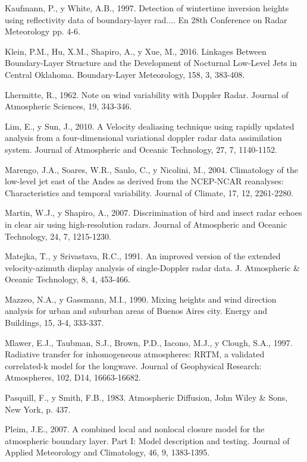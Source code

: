 \documentclass[12pt,spanish,oneside, a4paper]{book}
\begin{document}
\hypertarget{ref-Kaufmann1997}{}
Kaufmann, P., y White, A.B., 1997. Detection of wintertime inversion
heights using reflectivity data of boundary-layer rad.... En 28th
Conference on Radar Meteorology pp. 4-6.

\hypertarget{ref-Klein2016}{}
Klein, P.M., Hu, X.M., Shapiro, A., y Xue, M., 2016. Linkages Between
Boundary-Layer Structure and the Development of Nocturnal Low-Level Jets
in Central Oklahoma. Boundary-Layer Meteorology, 158, 3, 383-408.

\hypertarget{ref-Lhermitte1962}{}
Lhermitte, R., 1962. Note on wind variability with Doppler Radar.
Journal of Atmospheric Sciences, 19, 343-346.

\hypertarget{ref-Lim2010}{}
Lim, E., y Sun, J., 2010. A Velocity dealiasing technique using rapidly
updated analysis from a four-dimensional variational doppler radar data
assimilation system. Journal of Atmospheric and Oceanic Technology, 27,
7, 1140-1152.

\hypertarget{ref-Marengo2004}{}
Marengo, J.A., Soares, W.R., Saulo, C., y Nicolini, M., 2004.
Climatology of the low-level jet east of the Andes as derived from the
NCEP-NCAR reanalyses: Characteristics and temporal variability. Journal
of Climate, 17, 12, 2261-2280.

\hypertarget{ref-Martin2007}{}
Martin, W.J., y Shapiro, A., 2007. Discrimination of bird and insect
radar echoes in clear air using high-resolution radars. Journal of
Atmospheric and Oceanic Technology, 24, 7, 1215-1230.

\hypertarget{ref-Matejka1991}{}
Matejka, T., y Srivastava, R.C., 1991. An improved version of the
extended velocity-azimuth display analysis of single-Doppler radar data.
J. Atmospheric \& Oceanic Technology, 8, 4, 453-466.

\hypertarget{ref-Mazzeo1990}{}
Mazzeo, N.A., y Gassmann, M.I., 1990. Mixing heights and wind direction
analysis for urban and suburban areas of Buenos Aires city. Energy and
Buildings, 15, 3-4, 333-337.

\hypertarget{ref-Mlawer1997}{}
Mlawer, E.J., Taubman, S.J., Brown, P.D., Iacono, M.J., y Clough, S.A.,
1997. Radiative transfer for inhomogeneous atmospheres: RRTM, a
validated correlated-k model for the longwave. Journal of Geophysical
Research: Atmospheres, 102, D14, 16663-16682.

\hypertarget{ref-Pasquill1983}{}
Pasquill, F., y Smith, F.B., 1983. Atmospheric Diffusion, John Wiley \&
Sons, New York, p. 437.

\hypertarget{ref-Pleim2007}{}
Pleim, J.E., 2007. A combined local and nonlocal closure model for the
atmospheric boundary layer. Part I: Model description and testing.
Journal of Applied Meteorology and Climatology, 46, 9, 1383-1395.
\end{document}
